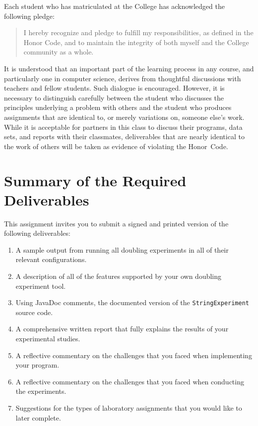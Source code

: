 Each student who has matriculated at the College has acknowledged the following pledge:
\vspace*{-.1in}
\begin{quote}
  I hereby recognize and pledge to fulfill my responsibilities, as defined in the Honor Code, and to maintain the
  integrity of both myself and the College community as a whole.
\end{quote}
\vspace*{-.1in}

\noindent It is understood that an important part of the learning process in any course, and particularly one in
computer science, derives from thoughtful discussions with teachers and fellow students.  Such dialogue is encouraged.
However, it is necessary to distinguish carefully between the student who discusses the principles underlying a problem
with others and the student who produces assignments that are identical to, or merely variations on, someone else's
work. While it is acceptable for partners in this class to discuss their programs, data sets, and reports with their
classmates, deliverables that are nearly identical to the work of others will be taken as evidence of violating the
\mbox{Honor Code}.

\section*{Summary of the Required Deliverables}

This assignment invites you to submit a signed and printed version of the following deliverables:

\begin{enumerate}

  \itemsep0in

  \item A sample output from running all doubling experiments in all of their relevant configurations.

  \item A description of all of the features supported by your own doubling experiment tool.

  \item Using JavaDoc comments, the documented version of the {\tt StringExperiment} source code.

  \item A comprehensive written report that fully explains the results of your experimental studies.

  \item A reflective commentary on the challenges that you faced when implementing your program.

  \item A reflective commentary on the challenges that you faced when conducting the experiments.

  \item Suggestions for the types of laboratory assignments that you would like to later complete.

\end{enumerate}

